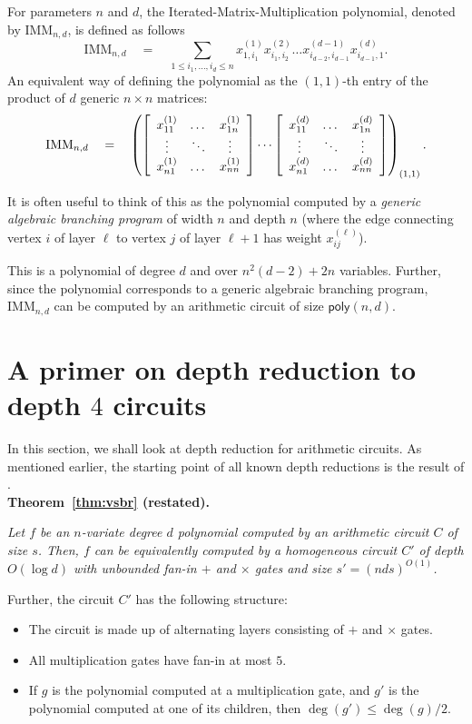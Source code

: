\documentclass{beatcs}
\newcommand{\IMM}{\mathrm{IMM}}
\newcommand{\poly}{\mathsf{poly}}
\newcommand{\spaced}[1]{\quad#1\quad}
\begin{document}
For parameters $n$ and $d$, the Iterated-Matrix-Multiplication polynomial, denoted by $\IMM_{n,d}$, is defined as follows
$$
\IMM_{n,d} \spaced{=} \sum_{1\leq i_1,\dots, i_d\leq n} x_{1,i_1}^{(1)}x_{i_1,i_2}^{(2)}\dots x_{i_{d-2},i_{d-1}}^{(d-1)}x_{i_{d-1},1}^{(d)}.
$$
An equivalent way of defining the polynomial as the $(1,1)$-th entry of the product of $d$ generic $n\times n$ matrices:
$$
\IMM_{n,d} \spaced{=} \inparen{\insquare{\begin{array}{ccc} x_{11}^{(1)} & \dots & x_{1n}^{(1)}\\ \vdots & \ddots & \vdots \\ x_{n1}^{(1)} & \dots & x_{nn}^{(1)}\end{array}} \cdots \insquare{\begin{array}{ccc} x_{11}^{(d)} & \dots & x_{1n}^{(d)}\\ \vdots & \ddots & \vdots \\ x_{n1}^{(d)} & \dots & x_{nn}^{(d)}\end{array}}}_{(1,1)}.
$$

It is often useful to think of this as the polynomial computed by a \emph{generic algebraic branching program} of width $n$ and depth $n$ (where the edge connecting vertex $i$ of layer $\ell$ to vertex $j$ of layer $\ell+1$ has weight $x_{ij}^{(\ell)}$). 

This is a polynomial of degree $d$ and over $n^2(d-2) + 2n$ variables. Further, since the polynomial corresponds to a generic algebraic branching program, $\IMM_{n,d}$ can be computed by an arithmetic circuit of size $\poly(n,d)$. 

\section{A primer on depth reduction to depth $4$ circuits}\label{sec:depth-red}

In this section, we shall look at depth reduction for arithmetic circuits. As mentioned earlier, the starting point of all known depth reductions is the result of \cite{vsbr83}. \\

{\bf Theorem~\ref{thm:vsbr} (restated).} {\em Let $f$ be an $n$-variate degree $d$ polynomial computed by an arithmetic circuit $C$ of size $s$. Then, $f$ can be equivalently computed by a homogeneous circuit $C'$ of depth $O(\log d)$ with unbounded fan-in $+$ and $\times$ gates and size $s' = (nds)^{O(1)}$. 

Further, the circuit $C'$ has the following structure:
\begin{itemize}
\item The circuit is made up of alternating layers consisting of $+$ and $\times$  gates. 
\item All multiplication gates have fan-in at most $5$.
\item If $g$ is the polynomial computed at a multiplication gate, and $g'$ is the polynomial computed at one of its children, then $\deg(g') \leq \deg(g)/2$. 
\end{itemize}
}
\end{document}
